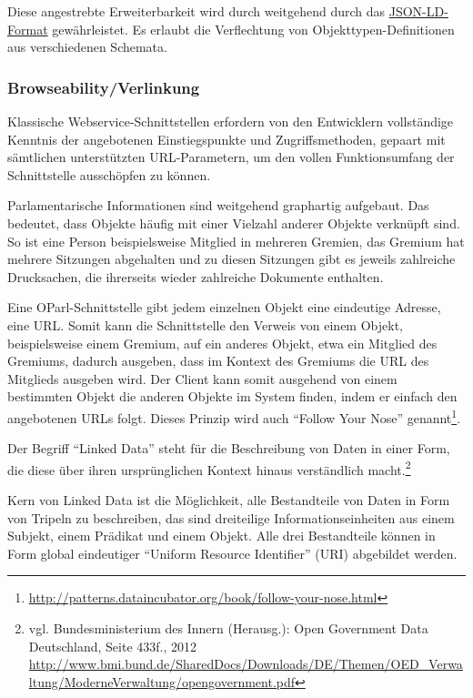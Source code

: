 \documentclass[,a4paper]{article}
\begin{document}
Diese angestrebte Erweiterbarkeit wird durch weitgehend durch das
\hyperref[jsonld]{JSON-LD-Format} gewährleistet. Es erlaubt die
Verflechtung von Objekttypen-Definitionen aus verschiedenen Schemata.

\subsubsection{Browseability/Verlinkung}\label{browseabilityux5fverlinkung}

Klassische Webservice-Schnittstellen erfordern von den Entwicklern
vollständige Kenntnis der angebotenen Einstiegspunkte und
Zugriffsmethoden, gepaart mit sämtlichen unterstützten URL-Parametern,
um den vollen Funktionsumfang der Schnittstelle ausschöpfen zu können.

Parlamentarische Informationen sind weitgehend graphartig aufgebaut. Das
bedeutet, dass Objekte häufig mit einer Vielzahl anderer Objekte
verknüpft sind. So ist eine Person beispielsweise Mitglied in mehreren
Gremien, das Gremium hat mehrere Sitzungen abgehalten und zu diesen
Sitzungen gibt es jeweils zahlreiche Drucksachen, die ihrerseits wieder
zahlreiche Dokumente enthalten.

Eine OParl-Schnittstelle gibt jedem einzelnen Objekt eine eindeutige
Adresse, eine URL. Somit kann die Schnittstelle den Verweis von einem
Objekt, beispielsweise einem Gremium, auf ein anderes Objekt, etwa ein
Mitglied des Gremiums, dadurch ausgeben, dass im Kontext des Gremiums
die URL des Mitglieds ausgeben wird. Der Client kann somit ausgehend von
einem bestimmten Objekt die anderen Objekte im System finden, indem er
einfach den angebotenen URLs folgt. Dieses Prinzip wird auch ``Follow
Your Nose'' genannt\footnote{\url{http://patterns.dataincubator.org/book/follow-your-nose.html}}.


Der Begriff ``Linked Data'' steht für die Beschreibung von Daten in
einer Form, die diese über ihren ursprünglichen Kontext hinaus
verständlich macht.\footnote{vgl. Bundesministerium des Innern
  (Herausg.): Open Government Data Deutschland, Seite 433f., 2012
  \url{http://www.bmi.bund.de/SharedDocs/Downloads/DE/Themen/OED_Verwaltung/ModerneVerwaltung/opengovernment.pdf}}

Kern von Linked Data ist die Möglichkeit, alle Bestandteile von Daten in
Form von Tripeln zu beschreiben, das sind dreiteilige
Informationseinheiten aus einem Subjekt, einem Prädikat und einem
Objekt. Alle drei Bestandteile können in Form global eindeutiger
``Uniform Resource Identifier'' (URI) abgebildet werden.
\end{document}

